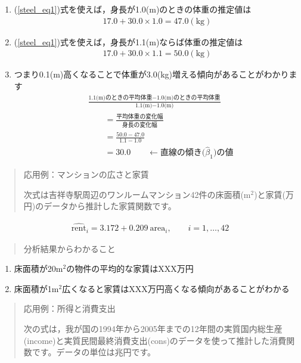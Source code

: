 \documentclass[
]{book}
\providecommand{\tightlist}{%
  \setlength{\itemsep}{0pt}\setlength{\parskip}{0pt}}
\theoremstyle{definition}
\theoremstyle{definition}
\theoremstyle{definition}
\theoremstyle{definition}
\theoremstyle{remark}
\begin{document}
\begin{enumerate}
\def\labelenumi{\arabic{enumi}.}
\setcounter{enumi}{2}
\item
  (\ref{steel_eq1})式を使えば，身長が1.0(m)のときの体重の推定値は
  \begin{align*}
  17.0+30.0 \times 1.0 = 47.0 (\text{kg})
  \end{align*}
\item
  (\ref{steel_eq1})式を使えば，身長が1.1(m)ならば体重の推定値は
  \begin{align*}
  17.0+30.0 \times 1.1 = 50.0 (\text{kg})
  \end{align*}
\item
  つまり0.1(m)高くなることで体重が3.0(kg)増える傾向があることがわかります
  \begin{align*}
  &\frac{\text{1.1(m)のときの平均体重}-\text{1.0(m)のときの平均体重}}{\text{1.1(m)}-\text{1.0(m)}} \\
  &\qquad=\frac{\text{平均体重の変化幅}}{\text{身長の変化幅}} \\
  &\qquad=\frac{50.0-47.0}{1.1-1.0} \\
  &\qquad=30.0\qquad \leftarrow \text{直線の傾き($\hat\beta_1$)の値}
  \end{align*}
\end{enumerate}

\begin{quote}
応用例：マンションの広さと家賃

次式は吉祥寺駅周辺のワンルームマンション42件の床面積(m\(^2\))と家賃(万円)のデータから推計した家賃関数です。
\end{quote}

\begin{align*}
\widehat{\text{rent}}_i=3.172+0.209~\text{area}_i, \qquad i=1,\dots, 42
\end{align*}

\begin{quote}
分析結果からわかること
\end{quote}

\begin{enumerate}
\def\labelenumi{\arabic{enumi}.}
\tightlist
\item
  床面積が20m\(^2\)の物件の平均的な家賃はXXX万円
\item
  床面積が1m\(^2\)広くなると家賃はXXX万円高くなる傾向があることがわかる
\end{enumerate}

\begin{quote}
応用例：所得と消費支出

次の式は，我が国の1994年から2005年までの12年間の実質国内総生産(income)と実質民間最終消費支出(cons)のデータを使って推計した消費関数です。データの単位は兆円です。
\end{quote}
\end{document}
